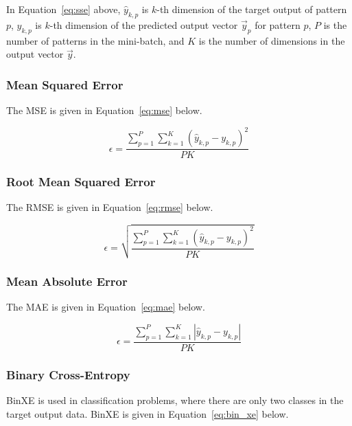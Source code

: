 \noindent
In Equation~\eqref{eq:sse} above, $\hat{y}_{k,p}$ is $k$-th dimension of the target output of pattern $p$, $y_{k,p}$ is $k$-th dimension of the predicted output vector $\vec{y}_{p}$ for pattern $p$, $P$ is the number of patterns in the mini-batch, and $K$ is the number of dimensions in the output vector $\vec{y}$.


\subsubsection{Mean Squared Error}\label{sec:anns:training:error_functions:mse}

The \acs{MSE} is given in Equation~\eqref{eq:mse} below.

\begin{equation}
      \epsilon = \frac{\sum_{p=1}^P \sum_{k=1}^K (\hat{y}_{k,p} - y_{k,p})^2}{PK}
      \label{eq:mse}
\end{equation}


\subsubsection{Root Mean Squared Error}\label{sec:anns:training:error_functions:rmse}

The \acs{RMSE} is given in Equation~\eqref{eq:rmse} below.

\begin{equation}
      \epsilon = \sqrt{\frac{\sum_{p=1}^P \sum_{k=1}^K (\hat{y}_{k,p} - y_{k,p})^2}{PK}}
      \label{eq:rmse}
\end{equation}


\subsubsection{Mean Absolute Error}\label{sec:anns:training:error_functions:mae}

The \acs{MAE} is given in Equation~\eqref{eq:mae} below.

\begin{equation}
      \epsilon = \frac{\sum_{p=1}^P \sum_{k=1}^K |\hat{y}_{k,p} - y_{k,p}|}{PK}
      \label{eq:mae}
\end{equation}


\subsubsection{Binary Cross-Entropy}\label{sec:anns:training:error_functions:bin_xe}

\acs{BinXE} is used in classification problems, where there are only two classes in the target output data. \acs{BinXE} is given in Equation~\eqref{eq:bin_xe} below.

